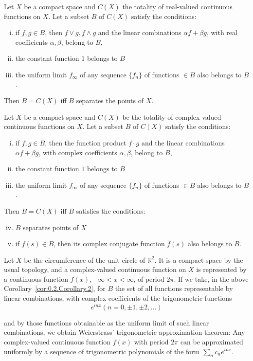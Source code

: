 \begin{corollary}\label{cor:0.2.Corollary.1} Let $X$ be a compact space and $C(X)$ the totality of real-valued continuous functions on $X$. Let a subset $B$ of $C(X)$ satisfy the conditions: \begin{enumerate}[(i)]
\item if $f, g \in B$, then $f \vee g, f \wedge g$ and the linear combinations $\alpha f + \beta g$, with real coefficients $\alpha, \beta$, belong to $B$,
\item the constant function $1$ belongs to $B$
\item the uniform limit $f_{\infty}$ of any sequence $\{f_n\}$ of functions $\in B$ also belongs to $B$.
\end{enumerate}
 Then $B = C(X)$ iff $B$ separates the points of $X$. 
\end{corollary}

\begin{corollary}\label{cor:0.2.Corollary.2} Let $X$ be a compact space and $C(X)$ be the totality of complex-valued continuous functions on $X$. Let a subset $B$ of $C(X)$ satisfy the conditions: \begin{enumerate}[(i)]
\item if $f, g \in B$, then the function product $f \cdot g$ and the linear combinations $\alpha f + \beta g$, with complex coefficients $\alpha, \beta$, belong to $B$,
\item the constant function $1$ belongs to $B$
\item the uniform limit $f_{\infty}$ of any sequence $\{f_n\}$ of functions $\in B$ also belongs to $B$.
\end{enumerate}
 Then $B = C(X)$ iff $B$ satisfies the conditions: \begin{enumerate}[(i)]
\setcounter{enumi}{3}
\item $B$ separates points of $X$
\item if $f(s) \in B$, then its complex conjugate function $\bar{f}(s)$ also belongs to $B$.
\end{enumerate}
\end{corollary}

\begin{theoremn} Let $X$ be the circumference of the unit circle of $\mathbb{R}^{2}$. It is a compact space by the usual topology, and a complex-valued continuous function on $X$ is represented by a continuous function $f(x),-\infty < x < \infty$, of period $2\pi$. If we take, in the above Corollary~\ref{cor:0.2.Corollary.2}, for $B$ the set of all functions representable by linear combinations, with complex coefficients of the trigonometric functions 
\[
e ^{inx} (n = 0, \pm 1, \pm 2, \dots)
\]

and by those functions obtainable as the uniform limit of such linear combinations, we obtain Weierstrass' trigonometric approximation theorem: Any complex-valued continuous function $f(x)$ with period $2\pi$ can be approximated uniformly by a sequence of trigonometric polynomials of the form $\sum\limits_{n} c_n e^{inx}$. 
\end{theoremn}

